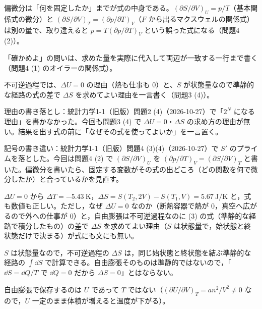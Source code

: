 \begin{daiji}
  \item 偏微分は「何を固定したか」までが式の中身である。$(\partial S/\partial V)_{U}=p/T$（基本関係式の微分）と $(\partial S/\partial V)_{T}=(\partial p/\partial T)_{V}$（$F$ から出るマクスウェルの関係式）は別の量で、取り違えると $p=T(\partial p/\partial T)_{V}$ という誤った式になる（問題4 (2)）。
  \item 「確かめよ」の問いは、求めた量を実際に代入して両辺が一致する一行まで書く（問題4 (1) のオイラーの関係式）。
  \item 不可逆過程では、$\Delta U=0$ の理由（熱も仕事も 0）と、$S$ が状態量なので準静的な経路の式の差で $\Delta S$ を求めてよい理由を一言書く（問題3 (4)）。
\end{daiji}
\begin{maemo}
  \item 理由の書き落とし：統計力学1-1（旧版）問題2 (4)（2026-10-27）で「$2^{N}$ になる理由」を書かなかった。今回も問題3 (4) で $\Delta U=0$・$\Delta S$ の求め方の理由が無い。結果を出す式の前に「なぜその式を使ってよいか」を一言置く。
  \item 記号の書き違い：統計力学1-1（旧版）問題4 (3)(4)（2026-10-27）で $S'$ のプライムを落とした。今回は問題4 (2) で $(\partial S/\partial V)_{U}$ を $(\partial p/\partial T)_{V}=(\partial S/\partial V)_{T}$ と書いた。偏微分を書いたら、固定する変数がその式の出どころ（どの関数を何で微分したか）と合っているかを見直す。
\end{maemo}
\begin{kotaeran}
   $\Delta U=0$ から $\Delta T=\qty{-5.43}{\kelvin}$，$\Delta S=S(T_{2},2V)-S(T_{1},V)=\qty{5.67}{\joule\per\kelvin}$ と，式も数値も正しい。ただし，なぜ $\Delta U=0$ なのか（断熱容器で熱が 0，真空へ広がるので外への仕事が 0）と，自由膨張は不可逆過程なのに (3) の式（準静的な経路で積分したもの）の差で $\Delta S$ を求めてよい理由（$S$ は状態量で，始状態と終状態だけで決まる）が式にも文にも無い。
\end{kotaeran}
\begin{rikai}
  \item $S$ は状態量なので，不可逆過程の $\Delta S$ は，同じ始状態と終状態を結ぶ準静的な経路の $\int\dd S$ で計算できる。自由膨張そのものは準静的ではないので，「$\dd S=\dd Q/T$ で $\dd Q=0$ だから $\Delta S=0$」とはならない。
  \item 自由膨張で保存するのは $U$ であって $T$ ではない（$(\partial U/\partial V)_{T}=an^{2}/V^{2}\neq0$ なので，$U$ 一定のまま体積が増えると温度が下がる）。
\end{rikai}
